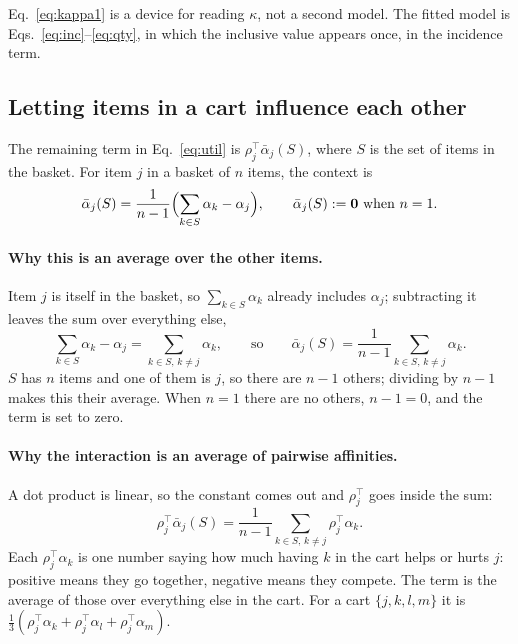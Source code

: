 \documentclass[11pt]{article}
\begin{document}
Eq.~\ref{eq:kappa1} is a device for reading $\kappa$, not a second model. The fitted
model is Eqs.~\ref{eq:inc}--\ref{eq:qty}, in which the inclusive value appears once, in
the incidence term.

\subsection{Letting items in a cart influence each other}
\label{sec:inter}

The remaining term in Eq.~\ref{eq:util} is $\rho_j^{\top}\bar\alpha_j(S)$, where $S$ is
the set of items in the basket. For item $j$ in a basket of $n$ items, the context is
\begin{equation}
\bar\alpha_j(S)=\frac{1}{n-1}\Bigl(\sum_{k\in S}\alpha_k-\alpha_j\Bigr),
\qquad \bar\alpha_j(S):=\mathbf 0 \text{ when } n=1.
\label{eq:ctx}
\end{equation}

\paragraph{Why this is an average over the other items.} Item $j$ is itself in the basket,
so $\sum_{k\in S}\alpha_k$ already includes $\alpha_j$; subtracting it leaves the sum over
everything else,
\begin{equation}
\sum_{k\in S}\alpha_k-\alpha_j=\sum_{k\in S,\,k\neq j}\alpha_k ,
\qquad\text{so}\qquad
\bar\alpha_j(S)=\frac{1}{n-1}\sum_{k\in S,\,k\neq j}\alpha_k .
\end{equation}
$S$ has $n$ items and one of them is $j$, so there are $n-1$ others; dividing by $n-1$
makes this their average. When $n=1$ there are no others, $n-1=0$, and the term is set to
zero.

\paragraph{Why the interaction is an average of pairwise affinities.} A dot product is
linear, so the constant comes out and $\rho_j^{\top}$ goes inside the sum:
\begin{equation}
\rho_j^{\top}\bar\alpha_j(S)=\frac{1}{n-1}\sum_{k\in S,\,k\neq j}\rho_j^{\top}\alpha_k .
\label{eq:pairwise}
\end{equation}
Each $\rho_j^{\top}\alpha_k$ is one number saying how much having $k$ in the cart helps or
hurts $j$: positive means they go together, negative means they compete. The term is the
average of those over everything else in the cart. For a cart $\{j,k,l,m\}$ it is
$\tfrac13(\rho_j^{\top}\alpha_k+\rho_j^{\top}\alpha_l+\rho_j^{\top}\alpha_m)$.
\end{document}
